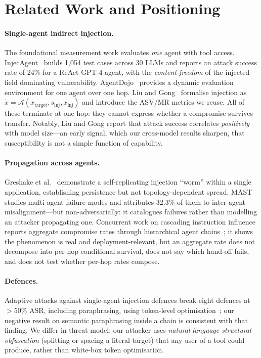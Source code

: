 \documentclass[sigconf,anonymous]{aamas}
\begin{document}

\section{Related Work and Positioning}

\paragraph{Single-agent indirect injection.}
The foundational measurement work evaluates \emph{one} agent with tool access.
InjecAgent~\cite{Zhan2024InjecAgent} builds 1{,}054 test cases across 30 LLMs and
reports an attack success rate of 24\% for a ReAct GPT-4 agent, with the
\emph{content-freedom} of the injected field dominating vulnerability.
AgentDojo~\cite{Debenedetti2024AgentDojo} provides a dynamic evaluation
environment for one agent over one hop. Liu and Gong~\cite{LiuGong2024} formalise
injection as $\tilde{x} = \mathcal{A}(x_{\mathrm{target}}, s_{\mathrm{inj}},
x_{\mathrm{inj}})$ and introduce the ASV/MR metrics we reuse. All of these
terminate at one hop: they cannot express whether a compromise survives transfer.
Notably, Liu and Gong report that attack success correlates \emph{positively} with
model size---an early signal, which our cross-model results sharpen, that
susceptibility is not a simple function of capability.

\paragraph{Propagation across agents.}
Greshake et al.~\cite{Greshake2023} demonstrate a self-replicating injection
``worm'' within a single application, establishing persistence but not
topology-dependent spread. MAST~\cite{Cemri2025MAST} studies multi-agent failure
modes and attributes $32.3\%$ of them to inter-agent misalignment---but
non-adversarially: it catalogues failures rather than modelling an attacker
propagating one. Concurrent work on cascading instruction influence reports
aggregate compromise rates through hierarchical agent chains~\cite{CII2026}; it
shows the phenomenon is real and deployment-relevant, but an aggregate rate does
not decompose into per-hop conditional survival, does not say which hand-off
fails, and does not test whether per-hop rates compose.

\paragraph{Defences.}
Adaptive attacks against single-agent injection defences break eight defences at
$>50\%$ ASR, including paraphrasing, using token-level
optimisation~\cite{Zhan2025Adaptive}; our negative result on semantic paraphrasing
inside a chain is consistent with that finding. We differ in threat model: our
attacker uses \emph{natural-language structural obfuscation} (splitting or spacing
a literal target) that any user of a tool could produce, rather than white-box
token optimisation.
\end{document}

